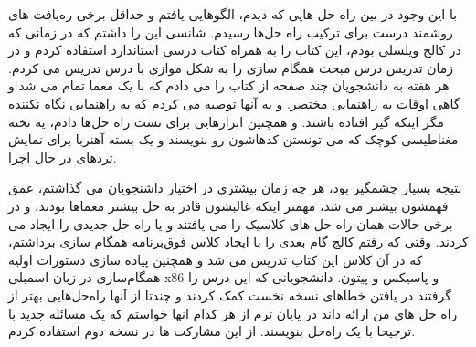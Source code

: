 \documentclass{book}
\begin{document}
با این وجود در بین راه حل هایی که دیدم، الگوهایی یافتم و حداقل برخی  ره‌یافت های روشمند درست برای ترکیب راه حل‌ها رسیدم.
شانسی این را داشتم که در زمانی که در کالج ویلسلی بودم، این کتاب را به همراه کتاب درسی استاندارد استفاده کردم و در زمان تدریس درس مبحث همگام سازی را به شکل موازی با درس تدریس می کردم. هر هفته به دانشجویان چند صفحه از کتاب را می دادم که با یک معما تمام می شد و گاهی اوقات یه راهنمایی مختصر. و به آنها توصیه می کردم که به راهنمایی نگاه نکننده مگر اینکه گیر افتاده باشند.
و همچنین ابزارهایی برای تست راه حل‌ها دادم، یه تخته مغناطیسی کوچک که می تونستن کدهاشون رو بنویسند و یک بسته آهنربا برای نمایش تردهای در حال اجرا.

نتیجه بسیار چشمگیر بود، هر چه زمان بیشتری در اختیار داشنجویان می گذاشتم، عمق فهمشون بیشتر می شد، مهمتر اینکه غالبشون قادر به حل بیشتر معماها بودند، و در برخی حالات همان راه حل های کلاسیک را می یافتند و یا راه حل جدیدی را ایجاد می کردند.
وقتی که رفتم کالج گام بعدی را با ایجاد کلاس فوق‌برنامه همگام سازی برداشتم، که در آن کلاس این کتاب تدریس می شد و همچنین پیاده سازی دستورات اولیه همگام‌سازی در زبان اسمبلی x86 و پاسیکس و پیتون.
دانشجویانی که این درس را گرفتند در یافتن خطاهای نسخه نخست کمک کردند و چندتا از آنها راه‌حل‌هایی بهتر از راه حل های من ارائه داند در پایان ترم از هر کدام انها خواستم که یک مسائله جدید با ترجیحا با یک راه‌حل بنویسند. از این مشارکت ها در نسخه دوم استفاده کردم.
\end{document}
